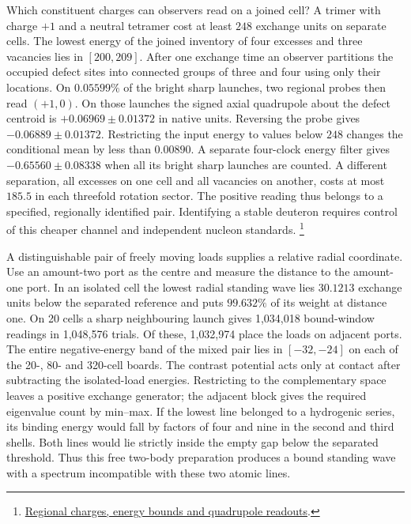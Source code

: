 \documentclass[11pt]{article}
\theoremstyle{definition}
\theoremstyle{remark}
\theoremstyle{plain}
\begin{document}
Which constituent charges can observers read on a joined cell? A trimer
with charge $+1$ and a neutral tetramer cost at least $248$ exchange units
on separate cells. The lowest energy of the joined inventory of four
excesses and three vacancies lies in $[200,209]$. After one exchange
time an observer partitions the occupied defect sites into connected
groups of three and four using only their locations. On $0.05599\%$ of
the bright sharp launches, two regional probes then read $(+1,0)$.
On those launches the signed axial quadrupole about the defect centroid
is $+0.06969\pm0.01372$ in native units. Reversing the probe gives
$-0.06889\pm0.01372$. Restricting the input energy to values below
$248$ changes the conditional mean by less than $0.00890$. A separate
four-clock energy filter gives $-0.65560\pm0.08338$ when all its bright
sharp launches are counted.
A different separation, all excesses on one cell and all vacancies on
another, costs at most $185.5$ in each threefold rotation sector.
The positive reading thus belongs to a
specified, regionally identified pair. Identifying a stable deuteron
requires control of this cheaper channel and independent nucleon standards.%
\footnote{\href{https://github.com/FloatingPragma/observer-patch-holography/tree/main/model/candidate_laws/interval_echo/openwave/row_16_binding/signed_pair}{Regional charges, energy bounds and quadrupole readouts}.}

A distinguishable pair of freely moving loads supplies a relative radial
coordinate. Use an amount-two port as the centre and measure the distance
to the amount-one port. In an isolated cell the lowest radial standing
wave lies $30.1213$ exchange units below the separated reference and puts
$99.632\%$ of its weight at distance one. On 20 cells a sharp neighbouring
launch gives 1,034,018 bound-window readings in 1,048,576 trials. Of these,
1,032,974 place the loads on adjacent ports. The entire negative-energy
band of the mixed pair lies in $[-32,-24]$ on each of the 20-, 80- and
320-cell boards. The contrast potential acts only at contact after
subtracting the isolated-load energies. Restricting to the complementary
space leaves a positive exchange generator; the adjacent block gives
the required eigenvalue count by min--max. If the lowest line belonged
to a hydrogenic series, its binding energy would fall by factors of four
and nine in the second and third shells. Both lines would lie strictly
inside the empty gap below the separated threshold. Thus this free
two-body preparation produces a bound standing wave with a spectrum
incompatible with these two atomic lines.
\end{document}

